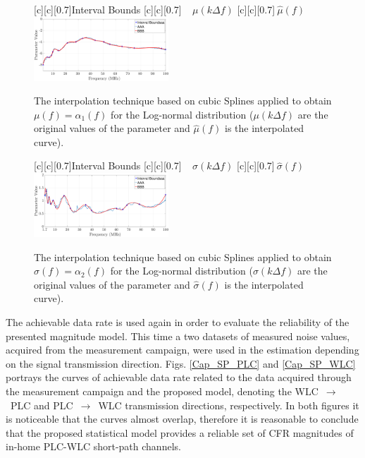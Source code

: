 \documentclass[journal]{IEEEtran}
\begin{document}
\begin{figure}[h]
	\centering
	[c][0.7]{Interval Bounds}
	[c][0.7]{$~~~~~\mu(k \Delta f)$}
	[c][0.7]{$~\hat{\mu}(f)$}
	\includegraphics[width=0.45\textwidth]{images/Alfa_fitsW.eps}
	\caption{The interpolation technique based on cubic Splines applied to obtain $\mu(f)=\alpha_1(f)$ for the Log-normal distribution (${\mu}(k \Delta f)$ are the original values of the parameter and $\hat{\mu}(f)$ is the interpolated curve).}
	\label{Fit_alfasW}
\end{figure}

\begin{figure}[h]
	\centering
	[c][0.7]{Interval Bounds}
	[c][0.7]{${~~~~~\sigma}(k \Delta f)$}
	[c][0.7]{$~\hat{\sigma}(f)$}
	\includegraphics[width=0.45\textwidth]{images/Beta_fitsW.eps}
	\caption{The interpolation technique based on cubic Splines applied to obtain $\sigma(f)=\alpha_2(f)$ for the Log-normal distribution (${\sigma}(k \Delta f)$ are the original values of the parameter and $\hat{\sigma}(f)$ is the interpolated curve).}
	\label{Fit_betasW}
\end{figure}

The achievable data rate is used again in order to evaluate the reliability of the presented magnitude model. This time a two datasets of measured noise values, acquired from the measurement campaign, were used in the estimation depending on the signal transmission direction. Figs. \ref{Cap_SP_PLC} and \ref{Cap_SP_WLC} portrays the curves of achievable data rate related to the data acquired through the measurement campaign and the proposed model, denoting the \ac{WLC}~$\rightarrow$~\ac{PLC} and \ac{PLC}~$\rightarrow$~\ac{WLC} transmission directions, respectively. In both figures it is noticeable that the curves almost overlap, therefore it is reasonable to conclude that the proposed statistical model provides a reliable set of \ac{CFR} magnitudes of in-home \ac{PLC}-\ac{WLC} short-path channels.
\end{document}
